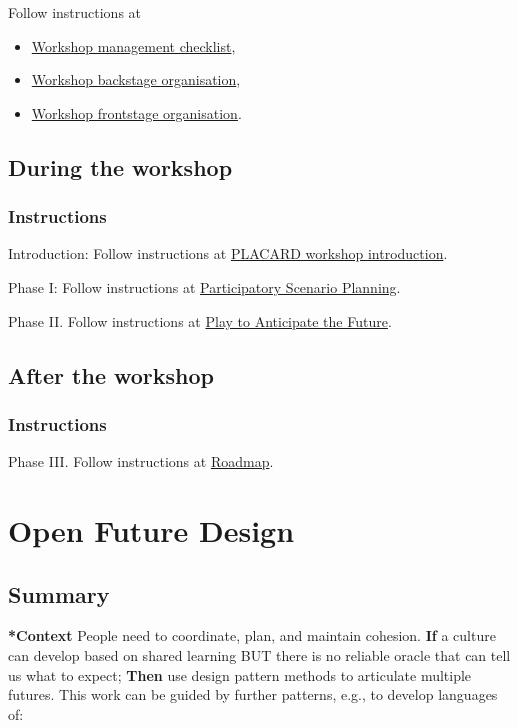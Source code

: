 \documentclass[11pt]{article}
\begin{document}
Follow instructions at
\begin{itemize}
\item \hyperref[e28fb669-45a6-4916-b56b-a3afd6238d4f]{Workshop management checklist},
\item \hyperref[781d52fa-71a9-4c90-b4f6-9b0dd4244c33]{Workshop backstage organisation},
\item \hyperref[2a01f142-31c7-4e86-ae10-e14e85b4dda9]{Workshop frontstage organisation}.
\end{itemize}

\subsection{During the workshop}
\label{c8823bc4-d08e-4486-9841-c914bba9977e}
\subsubsection{Instructions}
\label{sec:org7d32676}

Introduction: Follow instructions at \hyperref[b7b42aa2-c57c-4bcc-bc45-be9b63972be7]{PLACARD workshop introduction}.

Phase I: Follow instructions at \hyperref[95072d03-1359-4863-bad1-651191eb2f38]{Participatory Scenario Planning}.

Phase II. Follow instructions at \hyperref[85fefbc1-ca57-46fa-a8b2-154821a56c75]{Play to Anticipate the Future}.
\subsection{After the workshop}
\label{3d0acf49-0c87-4aaa-94b3-84e5d926d58d}
\subsubsection{Instructions}
\label{sec:org58d62b1}

Phase III. Follow instructions at \hyperref[92e18906-d0e6-4e73-a9cf-fbdad931f3cf]{Roadmap}.
\section{Open Future Design}
\label{66d6f9a0-c5ab-480d-8010-5c645aeadc17}
\subsection{Summary}
\label{sec:orgb6310a4}

\textbf{*Context} People need to coordinate, plan, and maintain cohesion. \textbf{If} a
culture can develop based on shared learning BUT there is no reliable
oracle that can tell us what to expect; \textbf{Then} use design pattern
methods to articulate multiple futures. This work can be guided by
further patterns, e.g., to develop languages of:
\end{document}
